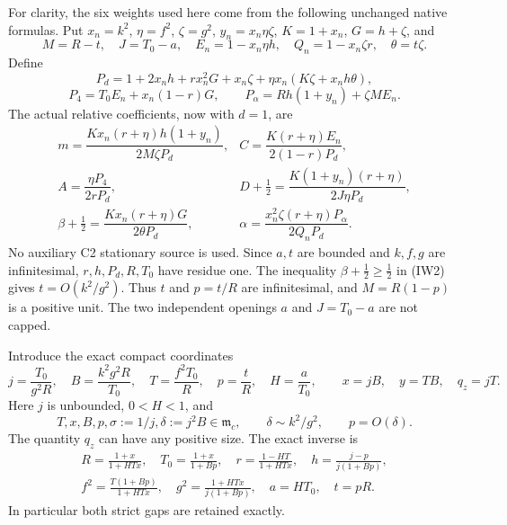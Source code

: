 For clarity, the six weights used here come from the following
unchanged native formulas. Put $x_n=k^2$, $\eta=f^2$, $\zeta=g^2$,
$y_n=x_n\eta\zeta$, $K=1+x_n$, $G=h+\zeta$, and
\[
 M=R-t,\quad J=T_0-a,\quad E_n=1-x_n\eta h,
 \quad Q_n=1-x_n\zeta r,\quad \theta=t\zeta.
\]
Define
\[
 P_d=1+2x_nh+rx_n^2G+x_n\zeta
       +\eta x_n(K\zeta+x_nh\theta),
\]
\[
 P_4=T_0E_n+x_n(1-r)G,\qquad
 P_\alpha=Rh(1+y_n)+\zeta M E_n.
\]
The actual relative coefficients, now with $d=1$, are
\[
\begin{array}{ll}
 m=\dfrac{Kx_n(r+\eta)h(1+y_n)}{2M\zeta P_d},&
 C=\dfrac{K(r+\eta)E_n}{2(1-r)P_d},\\[4pt]
 A=\dfrac{\eta P_4}{2rP_d},&
 D+\tfrac12=\dfrac{K(1+y_n)(r+\eta)}{2J\eta P_d},\\[4pt]
 \beta+\tfrac12=\dfrac{Kx_n(r+\eta)G}{2\theta P_d},&
 \alpha=\dfrac{x_n^2\zeta(r+\eta)P_\alpha}{2Q_nP_d}.
\end{array}                                                     \tag{IW2}
\]
No auxiliary C2 stationary source is used.
Since $a,t$ are bounded and $k,f,g$ are infinitesimal,
$r,h,P_d,R,T_0$ have residue one. The inequality
$\beta+\tfrac12\geq\tfrac12$ in (IW2) gives
$t=O(k^2/g^2)$. Thus $t$ and $p=t/R$ are infinitesimal, and
$M=R(1-p)$ is a positive unit. The two independent openings
$a$ and $J=T_0-a$ are not capped.

Introduce the exact compact coordinates
\[
 j=\frac{T_0}{g^2R},\quad B=\frac{k^2g^2R}{T_0},\quad
 T=\frac{f^2T_0}{R},\quad p=\frac tR,\quad H=\frac a{T_0},
 \qquad x=jB,\quad y=TB,\quad q_z=jT.                    \tag{IW3}
\]
Here $j$ is unbounded, $0<H<1$, and
\[
 T,x,B,p,\sigma:=1/j,\delta:=j^2B\in\mathfrak m_c,
 \qquad \delta\sim k^2/g^2,\qquad p=O(\delta).
                                                               \tag{IW4}
\]
The quantity $q_z$ can have any positive size. The exact inverse is
\[
\begin{gathered}
 R=\frac{1+x}{1+HTx},\quad T_0=\frac{1+x}{1+Bp},\quad
 r=\frac{1-HT}{1+HTx},\quad h=\frac{j-p}{j(1+Bp)},\\
 f^2=\frac{T(1+Bp)}{1+HTx},\quad
 g^2=\frac{1+HTx}{j(1+Bp)},\quad a=HT_0,\quad t=pR.
\end{gathered}                                                   \tag{IW5}
\]
In particular both strict gaps are retained exactly.

